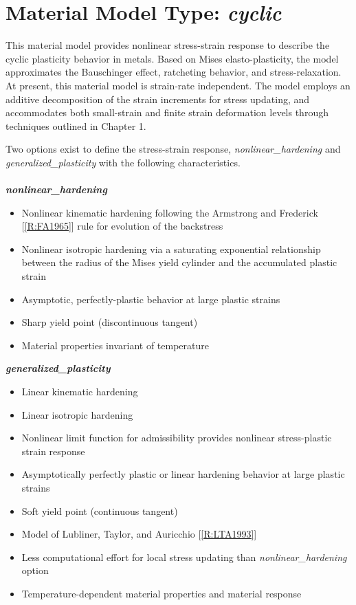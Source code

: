 \documentclass[11pt]{report}
\numberwithin{equation}{section}
\begin{document}
\section{Material Model Type: \textit{cyclic}}
\noindent This material model provides nonlinear stress-strain response to describe 
the cyclic plasticity behavior in metals. 
Based on Mises elasto-plasticity, the model approximates the Bauschinger effect, 
ratcheting behavior, and stress-relaxation. At present, this 
material model is strain-rate independent. The 
model employs  an additive decomposition of the strain increments 
for stress updating, and accommodates both small-strain and finite strain 
deformation levels through techniques outlined in Chapter 1. 

Two options exist to define the stress-strain response, \textit{nonlinear\_hardening}
and \textit{generalized\_plasticity} with the following characteristics.
\\ \\
\noindent \textit{\textbf{nonlinear\_hardening}}
\small
\begin {itemize}
\item Nonlinear kinematic hardening following the Armstrong and Frederick 
[\ref{R:FA1965}] rule for evolution of the backstress 
\item Nonlinear isotropic hardening via a saturating exponential relationship between 
the radius of the Mises yield cylinder and the accumulated plastic strain
\item Asymptotic, perfectly-plastic behavior at large plastic strains
\item Sharp yield point (discontinuous tangent)
\item Material properties invariant of temperature
\end{itemize}
\normalsize


\noindent \textit{\textbf{generalized\_plasticity}}
\small
\begin {itemize}
\item Linear kinematic hardening
\item Linear isotropic hardening
\item Nonlinear limit function for admissibility provides nonlinear stress-plastic strain response
\item Asymptotically perfectly plastic or linear hardening behavior at large plastic strains
\item Soft yield point (continuous tangent)
\item Model of Lubliner, Taylor, and Auricchio [\ref{R:LTA1993}]
\item Less computational effort for local stress updating than 
\textit{nonlinear\_hardening} option
\item Temperature-dependent material properties and material response 
\end{itemize}
\normalsize
\end{document}

